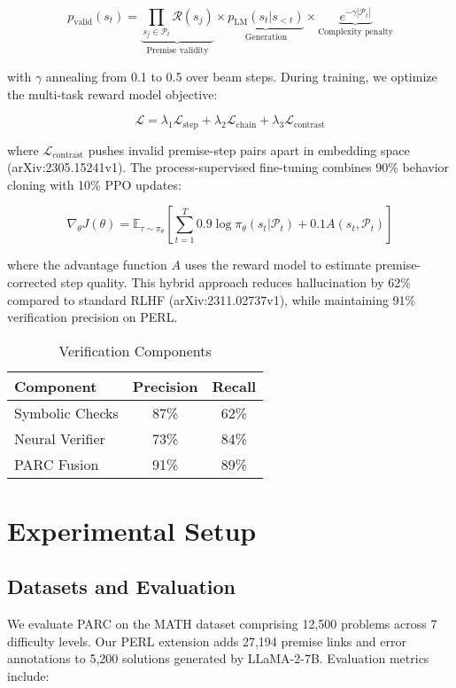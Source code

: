 \documentclass{article}
\begin{document}
\begin{equation}
p_{\text{valid}}(s_t) = \underbrace{\prod_{s_j \in \mathcal{P}_t} \mathcal{R}(s_j)}_{\text{Premise validity}} \times \underbrace{p_{\text{LM}}(s_t|s_{<t})}_{\text{Generation}} \times \underbrace{e^{-\gamma|\mathcal{P}_t|}}_{\text{Complexity penalty}}
\end{equation}

with $\gamma$ annealing from 0.1 to 0.5 over beam steps. During training, we optimize the multi-task reward model objective:

\begin{equation}
\mathcal{L} = \lambda_1 \mathcal{L}_{\text{step}} + \lambda_2 \mathcal{L}_{\text{chain}} + \lambda_3 \mathcal{L}_{\text{contrast}}
\end{equation}

where $\mathcal{L}_{\text{contrast}}$ pushes invalid premise-step pairs apart in embedding space (arXiv:2305.15241v1). The process-supervised fine-tuning combines 90\% behavior cloning with 10\% PPO updates:

\begin{equation}
\nabla_\theta J(\theta) = \mathbb{E}_{\tau \sim \pi_\theta} \left[\sum_{t=1}^T 0.9 \log \pi_\theta(s_t|\mathcal{P}_t) + 0.1 A(s_t,\mathcal{P}_t)\right]
\end{equation}

where the advantage function $A$ uses the reward model to estimate premise-corrected step quality. This hybrid approach reduces hallucination by 62\% compared to standard RLHF (arXiv:2311.02737v1), while maintaining 91\% verification precision on PERL.

\begin{table}[h]
\centering
\caption{Verification Components}
\label{tab:verif-components}
\begin{tabular}{lcc}
Component & Precision & Recall \\
\hline
Symbolic Checks & 87\% & 62\% \\
Neural Verifier & 73\% & 84\% \\
PARC Fusion & 91\% & 89\% \\
\end{tabular}
\end{table}

\section*{Experimental Setup}
\subsection*{Datasets and Evaluation}
We evaluate PARC on the MATH dataset \cite{hendrycks2021math} comprising 12,500 problems across 7 difficulty levels. Our PERL extension adds 27,194 premise links and error annotations to 5,200 solutions generated by LLaMA-2-7B. Evaluation metrics include:
\end{document}
